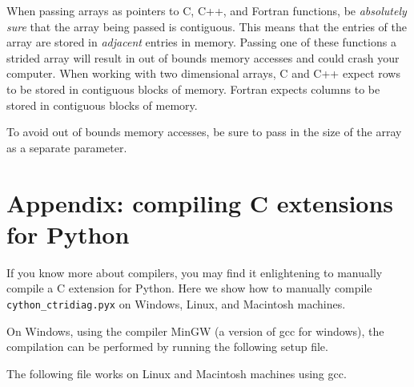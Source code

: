 \begin{warn}
When passing arrays as pointers to C, C++, and Fortran functions, be \emph{absolutely sure} that the array being passed is contiguous.
This means that the entries of the array are stored in \emph{adjacent} entries in memory.
Passing one of these functions a strided array will result in out of bounds memory accesses and could crash your computer.
When working with two dimensional arrays, C and C++ expect rows to be stored in contiguous blocks of memory.
Fortran expects columns to be stored in contiguous blocks of memory.

To avoid out of bounds memory accesses, be sure to pass in the size of the array as a separate parameter.
\end{warn}

\section*{Appendix: compiling C extensions for Python}
If you know more about compilers, you may find it enlightening to manually compile a C extension for Python.
Here we show how to manually compile \texttt{cython\_ctridiag.pyx} on Windows, Linux, and Macintosh machines.

On Windows, using the compiler MinGW (a version of gcc for windows), the compilation can be performed by running the following setup file.



The following file works on Linux and Macintosh machines using gcc.



